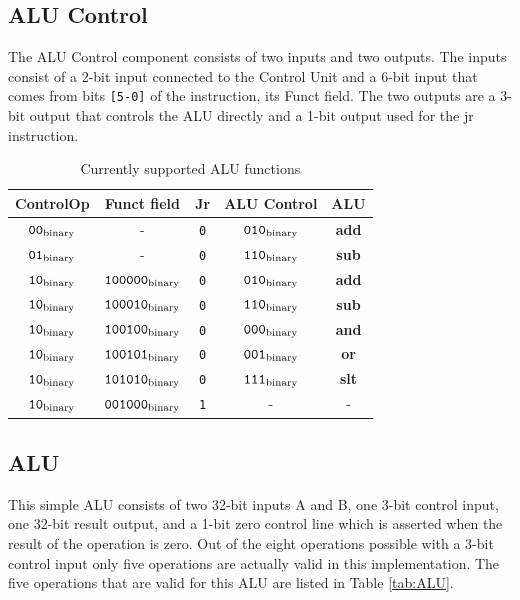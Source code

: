 \documentclass[]{spie}
\begin{document}
\subsection{ALU Control}
The ALU Control component consists of two inputs and two outputs. The inputs consist of a 2-bit input connected to the Control Unit
and a 6-bit input that comes from bits {\tt [5-0]} of the instruction, its Funct field. The two outputs are
a 3-bit output that controls the ALU directly and a 1-bit output used for the jr instruction.
          
     
\begin{table}[H]
	\begin{center}
	\begin{tabular}{|c|c||c|c|c|}
		\hline
		\rowcolor[gray]{.9} {\bf ControlOp} &{\bf Funct field} & {\bf Jr} & {\bf ALU Control} & {\bf ALU } \\ [12pt]
		\hline
		${\tt 00_{\rm binary}}$ & -                         & {\tt 0} & ${\tt 010_{\rm binary}}$ &{\bf add} \\
		${\tt 01_{\rm binary}}$ & -                         & {\tt 0} & ${\tt 110_{\rm binary}}$ &{\bf sub} \\
		${\tt 10_{\rm binary}}$ & ${\tt 100000_{\rm binary}}$ & {\tt 0} & ${\tt 010_{\rm binary}}$ &{\bf add} \\
		${\tt 10_{\rm binary}}$ & ${\tt 100010_{\rm binary}}$ & {\tt 0} & ${\tt 110_{\rm binary}}$ &{\bf sub} \\
		${\tt 10_{\rm binary}}$ & ${\tt 100100_{\rm binary}}$ & {\tt 0} & ${\tt 000_{\rm binary}}$ &{\bf and} \\
		${\tt 10_{\rm binary}}$ & ${\tt 100101_{\rm binary}}$ & {\tt 0} & ${\tt 001_{\rm binary}}$ &{\bf or} \\
		${\tt 10_{\rm binary}}$ & ${\tt 101010_{\rm binary}}$ & {\tt 0} & ${\tt 111_{\rm binary}}$ &{\bf slt} \\
		${\tt 10_{\rm binary}}$ & ${\tt 001000_{\rm binary}}$ & {\tt 1} & - & - \\
		\hline
	\end{tabular}
	\end {center}
	\caption{\label{tab:ALUControl} Currently supported ALU functions}
\end{table}

\subsection{ALU}
This simple ALU consists of two 32-bit inputs A and B, one 3-bit control input, one 32-bit result output, and
a 1-bit zero control line which is asserted when the result of the operation is zero. Out of the eight operations
possible with a 3-bit control input only five operations are actually valid in this implementation.
The five operations that are valid for this ALU are listed in Table \ref{tab:ALU}.
\end{document}

